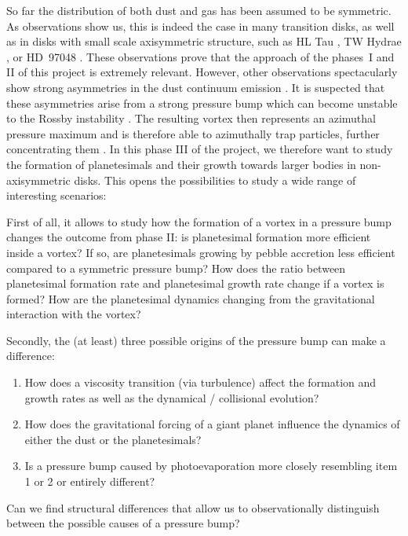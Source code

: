 \documentclass[10pt,fleqn,twoside]{article}
\begin{document}
So far the distribution of both dust and gas has been assumed to be
symmetric. As observations show us, this is indeed the case in many
transition disks, as well as in disks with small scale axisymmetric
structure, such as HL Tau
\citep{2015ApJ...808L...3A,2016ApJ...821L..16C}, TW Hydrae
\citep{2016ApJ...820L..40A,2016ApJ...829L..35T}, or HD~97048
\citep{2016arXiv160902488V}. These observations prove that the
approach of the phases~I and II of this project is extremely relevant.
However, other observations spectacularly show strong asymmetries
in the dust continuum emission \citep[e.g.,][]{2013Natur.493..191C,
2013Sci...340.1199V}. It is suspected that these asymmetries arise
from a strong pressure bump which can become unstable to the Rossby
instability \citep[e.g.,][]{2001ApJ...551..874L,2009A&A...493.1125L}.
The resulting vortex then represents an azimuthal pressure maximum and
is therefore able to azimuthally trap particles, further concentrating
them \citep[e.g.,][]{1995A&A...295L...1B,
1997Icar..128..213K, 2009A&A...493.1125L, 2013A&A...550L...8B,
2013ApJ...775...17L}. In this phase III of the project, we therefore
want to study the formation of planetesimals and their growth towards
larger bodies in non-axisymmetric disks. This opens the possibilities
to study a wide range of interesting scenarios:

First of all, it allows to study how the formation of a vortex in a
pressure bump changes the outcome from phase II: is planetesimal
formation more efficient inside a vortex? If so, are planetesimals
growing by pebble accretion less efficient compared to a symmetric
pressure bump? How does the ratio between planetesimal formation rate
and planetesimal growth rate change if a vortex is formed? How are the
planetesimal dynamics changing from the gravitational interaction with
the vortex?

Secondly, the (at least) three possible origins of the pressure bump
can make a difference:
\begin{enumerate}
  \item How does a viscosity transition (via turbulence) affect the
  formation and growth rates as well as the dynamical / collisional
  evolution?
  \item How does the gravitational forcing of a giant planet influence
  the dynamics of either the dust or the planetesimals?
  \item Is a pressure bump caused by photoevaporation more closely
  resembling item 1 or 2 or entirely different?
\end{enumerate}
Can we find structural differences that allow us to observationally
distinguish between the possible causes of a pressure bump?
\end{document}
